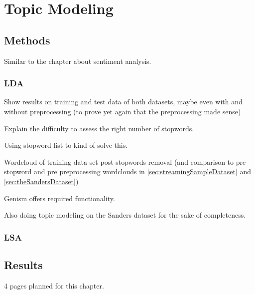 \chapter{Topic Modeling}
\label{ch:topicModeling}


\section{Methods}
\label{sec:methods}

Similar to the chapter about sentiment analysis.

\subsection{LDA}
\label{subsec:lda}

Show results on training and test data of both datasets, maybe even with and without preprocessing (to prove yet again that the preprocessing made sense)

Explain the difficulty to assess the right number of stopwords.

Using stopword list to kind of solve this.%

Wordcloud of training data set post stopwords removal (and comparison to pre stopword and pre preprocessing wordclouds in \ref{sec:streamingSampleDataset} and \ref{sec:theSandersDataset})

Genism offers required functionality. %

Also doing topic modeling on the Sanders dataset for the sake of completeness.

\subsection{LSA}
\label{subsec:lsa}

\section{Results}
\label{sec:results}


4 pages planned for this chapter.
\pagebreak[4]